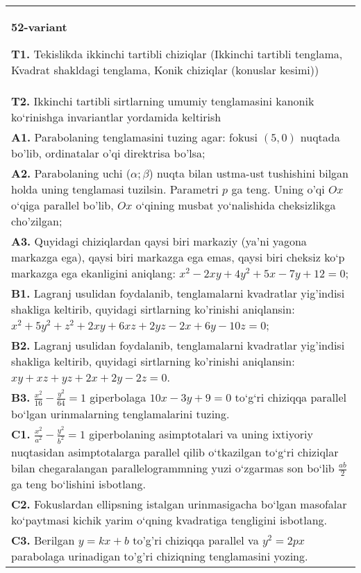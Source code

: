 \documentclass{article}
\begin{document}
\begin{tabular}{m{17cm}}
\textbf{52-variant}
\newline

\textbf{T1.} Tekislikda ikkinchi tartibli chiziqlar (Ikkinchi tartibli tenglama, Kvadrat shakldagi tenglama, Konik chiziqlar (konuslar kesimi)) \\
\textbf{T2.} Ikkinchi tartibli sirtlarning umumiy tenglamasini kanonik ko‘rinishga invariantlar yordamida keltirish \\
\textbf{A1.} Parabolaning tenglamasini tuzing agar: fokusi $(5,0)$ nuqtada bo'lib, ordinatalar o'qi direktrisa bo'lsa; \\
\textbf{A2.} Parabolaning uchi ($\alpha;\beta$) nuqta bilan ustma-ust tushishini bilgan holda uning tenglamasi tuzilsin. Parametri $p$ ga teng. Uning o'qi $O x$ o‘qiga parallel bo'lib, $O x$ o‘qining musbat yo‘nalishida cheksizlikga cho'zilgan; \\
\textbf{A3.} Quyidagi chiziqlardan qaysi biri markaziy (ya’ni yagona markazga ega), qaysi biri markazga ega emas, qaysi biri cheksiz ko‘p markazga ega ekanligini aniqlang: $x^2-2 x y+4 y^2+5 x-7 y+12=0$; \\
\textbf{B1.} Lagranj usulidan foydalanib, tenglamalarni kvadratlar yig'indisi shakliga keltirib, quyidagi sirtlarning ko'rinishi aniqlansin: $x^2+5 y^2+z^2+2 x y+6 x z+2 y z-2 x+6 y-10 z=0$; \\
\textbf{B2.} Lagranj usulidan foydalanib, tenglamalarni kvadratlar yig'indisi shakliga keltirib, quyidagi sirtlarning ko'rinishi aniqlansin: $x y+x z+y z+2 x+2 y-2 z=0$. \\
\textbf{B3.} $\frac{x^2}{16}-\frac{y^2}{64}=1$ giperbolaga $10 x-3 y+9=0$ to‘g‘ri chiziqqa parallel bo‘lgan urinmalarning tenglamalarini tuzing. \\
\textbf{C1.} $\frac{x^2}{a^2}-\frac{y^2}{b^2}=1$ giperbolaning asimptotalari va uning ixtiyoriy nuqtasidan asimptotalarga parallel qilib o‘tkazilgan to‘g‘ri chiziqlar bilan chegaralangan parallelogrammning yuzi o‘zgarmas son bo‘lib $\frac{a b}{2}$ ga teng bo‘lishini isbotlang. \\
\textbf{C2.} Fokuslardan ellipsning istalgan urinmasigacha bo‘lgan masofalar ko‘paytmasi kichik yarim o‘qning kvadratiga tengligini isbotlang. \\
\textbf{C3.} Berilgan $y=k x+b$ to'g'ri chiziqqa parallel va $y^2=2 p x$ parabolaga urinadigan to'g'ri chiziqning tenglamasini yozing. \\

\end{tabular}
\vspace{1cm}
\end{document}
